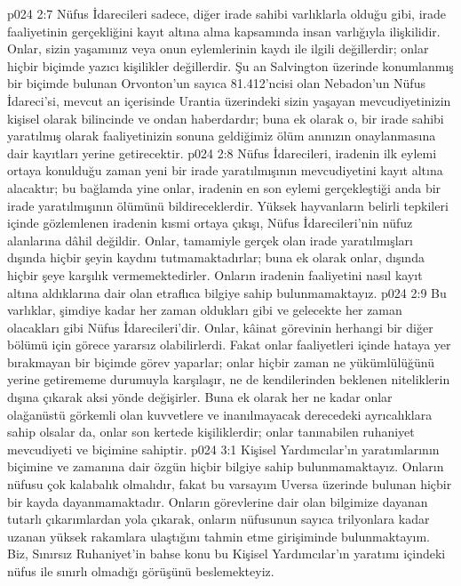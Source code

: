 \vs p024 2:7 Nüfus İdarecileri sadece, diğer irade sahibi varlıklarla olduğu gibi, irade faaliyetinin gerçekliğini kayıt altına alma kapsamında insan varlığıyla ilişkilidir. Onlar, sizin yaşamınız veya onun eylemlerinin kaydı ile ilgili değillerdir; onlar hiçbir biçimde yazıcı kişilikler değillerdir. Şu an Salvington üzerinde konumlanmış bir biçimde bulunan Orvonton’un sayıca 81.412’ncisi olan Nebadon’un Nüfus İdareci’si, mevcut an içerisinde Urantia üzerindeki sizin yaşayan mevcudiyetinizin kişisel olarak bilincinde ve ondan haberdardır; buna ek olarak o, bir irade sahibi yaratılmış olarak faaliyetinizin sonuna geldiğimiz ölüm anınızın onaylanmasına dair kayıtları yerine getirecektir.
\vs p024 2:8 Nüfus İdarecileri, iradenin ilk eylemi ortaya konulduğu zaman yeni bir irade yaratılmışının mevcudiyetini kayıt altına alacaktır; bu bağlamda yine onlar, iradenin en son eylemi gerçekleştiği anda bir irade yaratılmışının ölümünü bildireceklerdir. Yüksek hayvanların belirli tepkileri içinde gözlemlenen iradenin kısmi ortaya çıkışı, Nüfus İdarecileri’nin nüfuz alanlarına dâhil değildir. Onlar, tamamiyle gerçek olan irade yaratılmışları dışında hiçbir şeyin kaydını tutmamaktadırlar; buna ek olarak onlar,  dışında hiçbir şeye karşılık vermemektedirler. Onların iradenin faaliyetini nasıl kayıt altına aldıklarına dair olan etraflıca bilgiye sahip bulunmamaktayız.
\vs p024 2:9 Bu varlıklar, şimdiye kadar her zaman oldukları gibi ve gelecekte her zaman olacakları gibi Nüfus İdarecileri’dir. Onlar, kâinat görevinin herhangi bir diğer bölümü için görece yararsız olabilirlerdi. Fakat onlar faaliyetleri içinde hataya yer bırakmayan bir biçimde görev yaparlar; onlar hiçbir zaman ne yükümlülüğünü yerine getirememe durumuyla karşılaşır, ne de kendilerinden beklenen niteliklerin dışına çıkarak aksi yönde değişirler. Buna ek olarak her ne kadar onlar olağanüstü görkemli olan kuvvetlere ve inanılmayacak derecedeki ayrıcalıklara sahip olsalar da, onlar son kertede kişiliklerdir; onlar tanınabilen ruhaniyet mevcudiyeti ve biçimine sahiptir.
\vs p024 3:1 Kişisel Yardımcılar’ın yaratımlarının biçimine ve zamanına dair özgün hiçbir bilgiye sahip bulunmamaktayız. Onların nüfusu çok kalabalık olmalıdır, fakat bu varsayım Uversa üzerinde bulunan hiçbir bir kayda dayanmamaktadır. Onların görevlerine dair olan bilgimize dayanan tutarlı çıkarımlardan yola çıkarak, onların nüfusunun sayıca trilyonlara kadar uzanan yüksek rakamlara ulaştığını tahmin etme girişiminde bulunmaktayım. Biz, Sınırsız Ruhaniyet’in bahse konu bu Kişisel Yardımcılar’ın yaratımı içindeki nüfus ile sınırlı olmadığı görüşünü beslemekteyiz.
